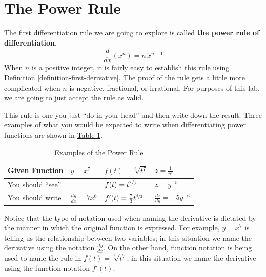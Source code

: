 \documentclass[12pt,]{book}
\newcommand{\terminology}[1]{\textbf{#1}}
\theoremstyle{plain}
\theoremstyle{definition}
\numberwithin{equation}{section}
\newcommand{\fe}[2]{#1\mathopen{}\left(#2\right)\mathclose{}}
\newcommand{\fd}[1]{#1'}
\newcommand{\lz}[2]{\frac{d#1}{d#2}}
\newcommand{\lzoo}[2]{{\frac{d}{d#1}}{\left(#2\right)}}
\begin{document}
\section[The Power Rule]{The Power Rule}\label{section-power-rule}
The first differentiation rule we are going to explore is called \terminology{the power rule of differentiation}. \begin{equation}\lzoo{x}{x^n}=n\,x^{n-1}\label{men-2}\end{equation} When \(n\) is a positive integer, it is fairly easy to establish this rule using \hyperref[definition-first-derivative]{Definition \ref{definition-first-derivative}}.  The proof of the rule gets a little more complicated when \(n\) is negative, fractional, or irrational.  For purposes of this lab, we are going to just accept the rule as valid.%
\par
This rule is one you just ``do in your head'' and then write down the result.  Three examples of what you would be expected to write when differentiating power functions are shown in \hyperref[table-power-rule]{Table \ref{table-power-rule}}.%
\begin{table}
\centering
\caption{Examples of the Power Rule\label{table-power-rule}}
\begin{tabular}{l|l|l|l}
\toprule
Given Function&\(y=x^7\)&\(\fe{f}{t}=\sqrt[3]{t^7}\)&\(z=\frac{1}{y^5}\)\\
\midrule
You should ``see''&&\(\fe{f}{t}=t^{\sfrac{7}{3}}\)&\(z=y^{-5}\)\\
\midrule
You should write&\(\lz{y}{x}=7x^6\)&\(\fe{\fd{f}}{t}=\frac{7}{3}t^{\sfrac{4}{3}}\)&\(\lz{z}{y}=-5y^{-6}\)\\
\bottomrule
\end{tabular}
\end{table}
\par
Notice that the type of notation used when naming the derivative is dictated by the manner in which the original function is expressed.  For example, \(y=x^7\) is telling us the relationship between two variables; in this situation we name the derivative using the notation \(\lz{y}{x}\).  On the other hand, function notation is being used to name the rule in \(\fe{f}{t}=\sqrt[3]{t^7}\); in this situation we name the derivative using the function notation \(\fe{\fd{f}}{t}\).%
\typeout{************************************************}
\typeout{************************************************}
\end{document}

